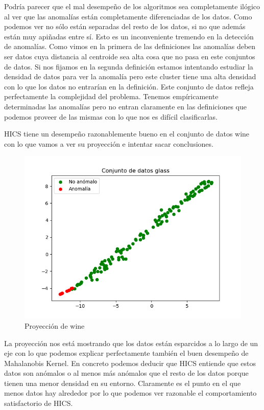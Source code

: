 Podría parecer que el mal desempeño de los algoritmos sea completamente ilógico al ver que las anomalías están completamente diferenciadas de los datos. Como podemos ver no sólo están separadas del resto de los datos, si no que además están muy apiñadas entre sí. Esto es un inconveniente tremendo en la detección de anomalías. Como vimos en la primera de las definiciones las anomalías deben ser datos cuya distancia al centroide sea alta cosa que no pasa en este conjuntos de datos. Si nos fijamos en la segunda definición estamos intentando estudiar la densidad de datos para ver la anomalía pero este cluster tiene una alta densidad con lo que los datos no entrarían en la definición. Este conjunto de datos refleja perfectamente la complejidad del problema. Tenemos empíricamente determinadas las anomalías pero no entran claramente en las definiciones que podemos proveer de las mismas con lo que nos es difícil clasificarlas.

HICS tiene un desempeño razonablemente bueno en el conjunto de datos wine con lo que vamos a ver su proyección e intentar sacar conclusiones.

\begin{figure}[H]
	\centering
	\label{wine}
	\includegraphics[scale=0.7]{imagenes/wine}
	\caption{Proyección de wine}
\end{figure}

La proyección nos está mostrando que los datos están esparcidos a lo largo de un eje con lo que podemos explicar perfectamente también el buen desempeño de Mahalanobis Kernel. En concreto podemos deducir que HICS entiende que estos datos son anómalos o al menos más anómalos que el resto de los datos porque tienen una menor densidad en su entorno. Claramente es el punto en el que menos datos hay alrededor por lo que podemos ver razonable el comportamiento satisfactorio de HICS.

